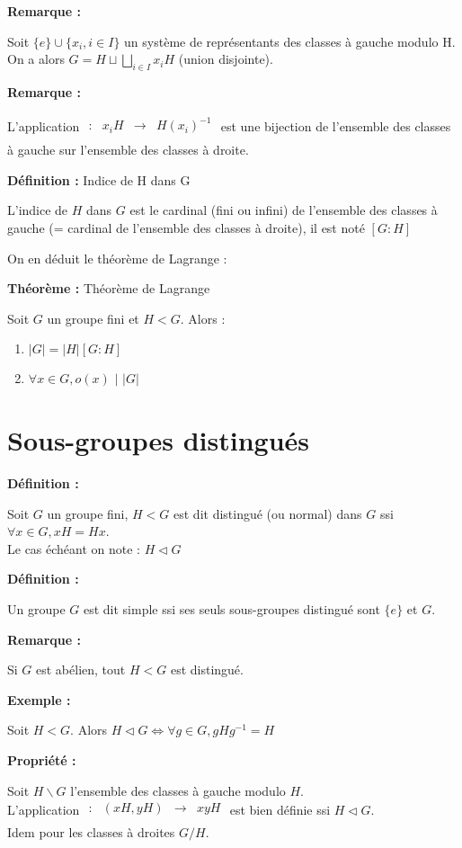 \documentclass{report}
\newenvironment{definition}[1][]{
    \begin{tcolorbox}[colframe= white]
    \textbf{Définition :} 
    #1 \par
    }
    {\end{tcolorbox}}
\newenvironment{prop}{\begin{tcolorbox}[colframe= white]
    \textbf{Propriété :}
     \par}
    {\end{tcolorbox}}
\newenvironment{exemple}{\begin{tcolorbox}[colback=gray!10,colframe= white]
    \textbf{Exemple :}
     \par}
    {\end{tcolorbox}}
\newenvironment{theoreme}[1][]{
    \begin{tcolorbox}[]
    \textbf{Théorème :} #1  \par} 
    {\end{tcolorbox}}
\newcommand{\remarque}{
    \noindent\textbf{Remarque :} \par
}
\newcommand{\fctsarg}[3]{
    \begin{array}{lrcl}
    #1: & #2 & \longrightarrow & #3 \\
    \end{array}
}
\begin{document}
\remarque 
Soit $\{e\}\cup\{x_i,i\in I\}$ un système de représentants des classes à gauche modulo H. On a alors $G = H \sqcup \displaystyle\bigsqcup_{i \in I} x_i H$ (union disjointe).

\remarque
L'application $\fctsarg{}{x_i H}{H (x_i)^{-1}}$ est une bijection de l'ensemble des classes à gauche sur l'ensemble des classes à droite.

\begin{definition}[Indice de H dans G]
    L'indice de $H$ dans $G$ est le cardinal (fini ou infini) de l'ensemble des classes à gauche (= cardinal de l'ensemble des classes à droite), il est noté $[G:H]$
\end{definition}

On en déduit le théorème de Lagrange :
\begin{theoreme}[Théorème de Lagrange]
    Soit $G$ un groupe fini et $H < G$. Alors :
    \begin{enumerate}
        \item $|G| = |H|[G:H]$
        \item $\forall x \in G, o(x)$ $|$ $|G|$
    \end{enumerate}
\end{theoreme}

\section{Sous-groupes distingués}

\begin{definition}
    Soit $G$ un groupe fini, $H < G$ est dit distingué (ou normal) dans $G$ ssi $\forall x \in G, xH = Hx$.\\
    Le cas échéant on note : $H \triangleleft G$
\end{definition}

\begin{definition}
    Un groupe $G$ est dit simple ssi ses seuls sous-groupes distingué sont $\{e\}$ et $G$.
\end{definition}

\remarque
Si $G$ est abélien, tout $H < G$ est distingué.

\begin{exemple}
    Soit $H < G$. Alors $H \triangleleft G \iff \forall g \in G, gHg^{-1} = H$
\end{exemple}

\begin{prop}
    Soit $H\backslash G$ l'ensemble des classes à gauche modulo $H$.\\
    L'application $\fctsarg{}{(xH,yH)}{xyH}$ est bien définie ssi $H \triangleleft G$.\\
    Idem pour les classes à droites $G/H$.
\end{prop}
\end{document}
